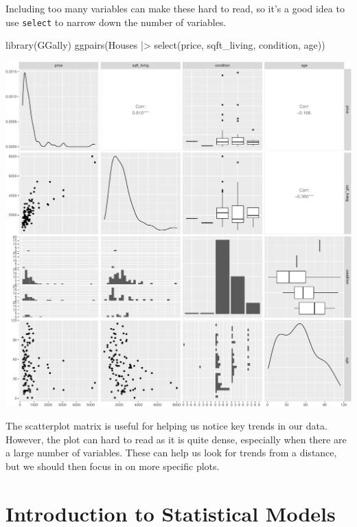 \documentclass[
  letterpaper,
  DIV=11,
  numbers=noendperiod]{scrreprt}
\newenvironment{Shaded}{\begin{snugshade}}{\end{snugshade}}
\newcommand{\FunctionTok}[1]{\textcolor[rgb]{0.28,0.35,0.67}{#1}}
\newcommand{\NormalTok}[1]{\textcolor[rgb]{0.00,0.23,0.31}{#1}}
\newcommand{\SpecialCharTok}[1]{\textcolor[rgb]{0.37,0.37,0.37}{#1}}
\begin{document}
Including too many variables can make these hard to read, so it's a good
idea to use \texttt{select} to narrow down the number of variables.

\begin{Shaded}
\begin{Highlighting}[]
\FunctionTok{library}\NormalTok{(GGally)}
\FunctionTok{ggpairs}\NormalTok{(Houses }\SpecialCharTok{|\textgreater{}} \FunctionTok{select}\NormalTok{(price, sqft\_living, condition, age))}
\end{Highlighting}
\end{Shaded}

\includegraphics{Ch1_files/figure-pdf/unnamed-chunk-33-1.pdf}

The scatterplot matrix is useful for helping us notice key trends in our
data. However, the plot can hard to read as it is quite dense,
especially when there are a large number of variables. These can help us
look for trends from a distance, but we should then focus in on more
specific plots.


\chapter{Introduction to Statistical
Models}\label{introduction-to-statistical-models}
\end{document}
